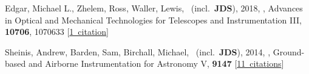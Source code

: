 \item[{\color{numcolor}\scriptsize2}] Edgar, Michael L., Zhelem, Ross, Waller, Lewis, \etal\ (incl.\ \textbf{JDS}), 2018, , Advances in Optical and Mechanical Technologies for Telescopes and Instrumentation III, \textbf{10706}, 1070633 [\href{https://ui.adsabs.harvard.edu/#abs/2018SPIE10706E..33E}{1~citation}]

\item[{\color{numcolor}\scriptsize1}] Sheinis, Andrew, Barden, Sam, Birchall, Michael, \etal\ (incl.\ \textbf{JDS}), 2014, , Ground-based and Airborne Instrumentation for Astronomy V, \textbf{9147} [\href{https://ui.adsabs.harvard.edu/#abs/2014SPIE.9147E..0YS}{11~citations}]